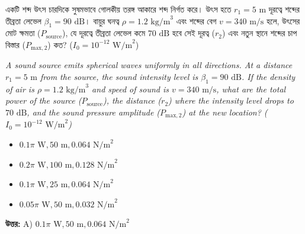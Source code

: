 \documentclass[12pt, a4paper]{article}
\begin{document}
\begin{tcolorbox}[questionbox={প্রশ্ন (Question) 25}]
    \noindent
    একটি শব্দ উৎস চারদিকে সুষমভাবে গোলকীয় তরঙ্গ আকারে শব্দ নির্গত করে। উৎস হতে $r_1 = 5\text{ m}$ দূরত্বে শব্দের তীব্রতা লেভেল $\beta_1 = 90\text{ dB}$। বায়ুর ঘনত্ব $\rho = 1.2\text{ kg/m}^3$ এবং শব্দের বেগ $v = 340\text{ m/s}$ হলে, উৎসের মোট ক্ষমতা ($P_{\text{source}}$), যে দূরত্বে তীব্রতা লেভেল কমে $70\text{ dB}$ হবে সেই দূরত্ব ($r_2$) এবং নতুন স্থানে শব্দের চাপ বিস্তার ($P_{\text{max},2}$) কত? ($I_0 = 10^{-12}\text{ W/m}^2$)
    
    \vspace{0.8em}
    \begin{english}
    \noindent\textit{\color{darkgray}
    A sound source emits spherical waves uniformly in all directions. At a distance $r_1 = 5\text{ m}$ from the source, the sound intensity level is $\beta_1 = 90\text{ dB}$. If the density of air is $\rho = 1.2\text{ kg/m}^3$ and speed of sound is $v = 340\text{ m/s}$, what are the total power of the source ($P_{\text{source}}$), the distance ($r_2$) where the intensity level drops to $70\text{ dB}$, and the sound pressure amplitude ($P_{\text{max},2}$) at the new location? ($I_0 = 10^{-12}\text{ W/m}^2$)
    }
    \end{english}
\end{tcolorbox}

\begin{itemize}[label={}, leftmargin=1cm, itemsep=0.5em]
    \item[\textbf{A)}] $0.1\pi\text{ W}, 50\text{ m}, 0.064\text{ N/m}^2$
    \item[\textbf{B)}] $0.2\pi\text{ W}, 100\text{ m}, 0.128\text{ N/m}^2$
    \item[\textbf{C)}] $0.1\pi\text{ W}, 25\text{ m}, 0.064\text{ N/m}^2$
    \item[\textbf{D)}] $0.05\pi\text{ W}, 50\text{ m}, 0.032\text{ N/m}^2$
\end{itemize}

\vspace{0.5em}
\begin{tcolorbox}[answerbox]
    \textbf{\color{success} উত্তর:} A) $0.1\pi\text{ W}, 50\text{ m}, 0.064\text{ N/m}^2$
\end{tcolorbox}
\vspace{1em}
\end{document}
